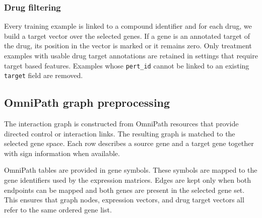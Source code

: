 

\subsubsection{Drug filtering}
\noindent Every training example is linked to a compound identifier and for each drug, we build a target vector over the selected genes. If a gene is an annotated target of the drug, its position in the vector is marked or it remains zero. Only treatment examples with usable drug target annotations are retained in settings that require target based features. Examples whose \texttt{pert\_id} cannot be linked to an existing \texttt{target} field are removed.



\subsection{OmniPath graph preprocessing}
\noindent The interaction graph is constructed from OmniPath resources that provide directed control or interaction links. The resulting graph is matched to the selected gene space. Each row describes a source gene and a target gene together with sign information when available.

\noindent OmniPath tables are provided in gene symbols. These symbols are mapped to the gene identifiers used by the expression matrices. Edges are kept only when both endpoints can be mapped and both genes are present in the selected gene set. This ensures that graph nodes, expression vectors, and drug target vectors all refer to the same ordered gene list.

